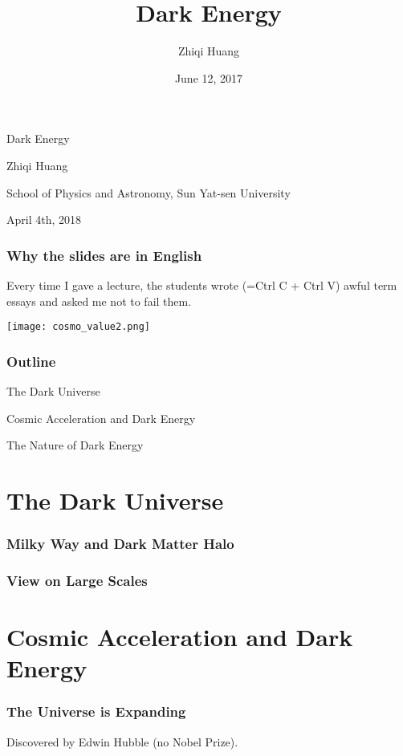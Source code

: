 \documentclass[CJK]{beamer}
\title{Dark Energy}
\author{Zhiqi Huang}
\institute{Sun Yat-sen University}
\date{June 12, 2017}
\begin{document}
\begin{frame}
  \bcenter
      {\Huge Dark Energy}

      
      Zhiqi Huang


      {\small School of Physics and Astronomy, Sun Yat-sen University}
      
      {\small April 4th, 2018}
      
      \ecenter
\end{frame}

\begin{frame}
\frametitle{Why the slides are in English}
           {\Large
             Every time I gave a lecture, the students wrote (=Ctrl C + Ctrl V) awful term essays and asked me not to fail them.

}
\end{frame}


\begin{frame}
\centering
\texttt{[image: cosmo\_value2.png]}
\end{frame}


\begin{frame}
\frametitle{Outline}
\bitem
\item{The Dark Universe}
\item{Cosmic Acceleration and Dark Energy}
\item{The Nature of Dark Energy}
\eitem
\end{frame}


\section{The Dark Universe}

\begin{frame}
  \frametitle{Milky Way and Dark Matter Halo}
\end{frame}

\begin{frame}
  \frametitle{View on Large Scales}
\end{frame}


\section{Cosmic Acceleration and Dark Energy}

\begin{frame}
  \frametitle{The Universe is Expanding}

  Discovered by Edwin Hubble (no Nobel Prize).
\end{frame}
\end{document}
